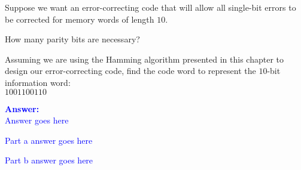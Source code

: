 \item{}
Suppose we want an error-correcting code that will allow all single-bit
errors to be corrected for memory words of length $10$.
\begin{list}{\textbf{}}{}
    \item How many parity bits are necessary?
    \item Assuming we are using the Hamming algorithm presented in this chapter
    to design our error-correcting code, find the code word to represent the
    $10$-bit information word:\\[3pt]
    $1001100110$
\end{list}
\vskip12pt
\ifanswers
\textcolor{blue}{
\textbf{Answer:}\\
Answer goes here
\begin{list}{\textbf{}}{}
    \item Part a answer goes here
    \item Part b answer goes here
\end{list}
}
\newpage
\fi
